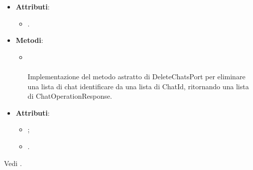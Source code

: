 \documentclass[10pt, a4paper]{article}
\begin{document}
    \label{DeleteChatsPostgresDettaglio}
    \begin{itemize}
        \item \textbf{Attributi}:
        \begin{itemize}
            \item {}.
        \end{itemize}
        \item \textbf{Metodi}:
        \begin{itemize}
            \item {}\\ \\
            Implementazione del metodo astratto di DeleteChatsPort per eliminare una lista di chat identificare da una lista di ChatId, ritornando una lista di ChatOperationResponse.
        \end{itemize}
    \end{itemize}
    
    \label{ChatOperationResponseDettaglio}
    \begin{itemize}
        \item \textbf{Attributi}:
        \begin{itemize}
            \item {};
            \item {}.
        \end{itemize}
    \end{itemize}
    
    Vedi .
    
    
\end{document}
